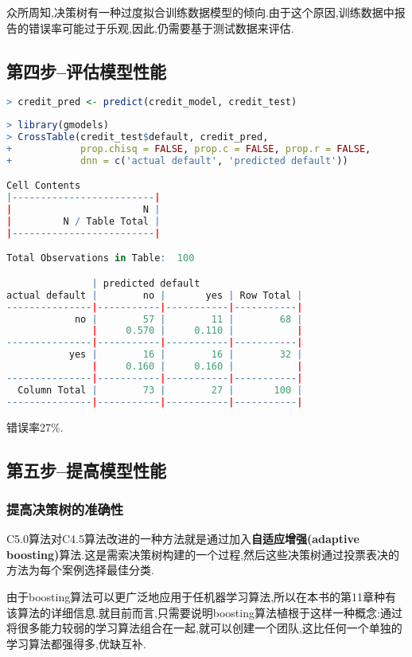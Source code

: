 \documentclass[11pt,a4paper,oneside]{book}
\begin{document}
众所周知,决策树有一种过度拟合训练数据模型的倾向.由于这个原因,训练数据中报告的错误率可能过于乐观,因此,仍需要基于测试数据来评估.

\subsection{第四步--评估模型性能}
\begin{lstlisting}[language=r]
> credit_pred <- predict(credit_model, credit_test)
\end{lstlisting}
\begin{lstlisting}[language=r]
> library(gmodels)
> CrossTable(credit_test$default, credit_pred,
+            prop.chisq = FALSE, prop.c = FALSE, prop.r = FALSE,
+            dnn = c('actual default', 'predicted default'))

Cell Contents
|-------------------------|
|                       N |
|         N / Table Total |
|-------------------------|

Total Observations in Table:  100 

               | predicted default 
actual default |        no |       yes | Row Total | 
---------------|-----------|-----------|-----------|
            no |        57 |        11 |        68 | 
               |     0.570 |     0.110 |           | 
---------------|-----------|-----------|-----------|
           yes |        16 |        16 |        32 | 
               |     0.160 |     0.160 |           | 
---------------|-----------|-----------|-----------|
  Column Total |        73 |        27 |       100 | 
---------------|-----------|-----------|-----------|
\end{lstlisting}
错误率27\%.

\subsection{第五步--提高模型性能}
\subsubsection{提高决策树的准确性}
C5.0算法对C4.5算法改进的一种方法就是通过加入\textbf{自适应增强(adaptive boosting)}算法.这是需索决策树构建的一个过程,然后这些决策树通过投票表决的方法为每个案例选择最佳分类.

由于boosting算法可以更广泛地应用于任机器学习算法,所以在本书的第11章种有该算法的详细信息.就目前而言,只需要说明boosting算法植根于这样一种概念:通过将很多能力较弱的学习算法组合在一起,就可以创建一个团队,这比任何一个单独的学习算法都强得多,优缺互补.
\end{document}
